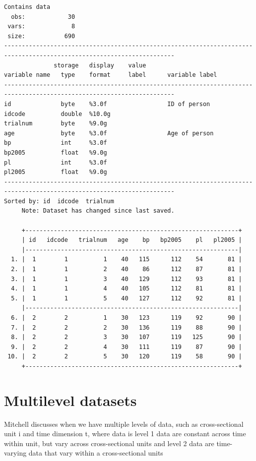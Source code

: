\documentclass[
]{book}
\begin{document}
\begin{verbatim}
Contains data
  obs:            30                          
 vars:             8                          
 size:           690                          
----------------------------------------------------------------------------------------------------------------------
              storage   display    value
variable name   type    format     label      variable label
----------------------------------------------------------------------------------------------------------------------
id              byte    %3.0f                 ID of person
idcode          double  %10.0g                
trialnum        byte    %9.0g                 
age             byte    %3.0f                 Age of person
bp              int     %3.0f                 
bp2005          float   %9.0g                 
pl              int     %3.0f                 
pl2005          float   %9.0g                 
----------------------------------------------------------------------------------------------------------------------
Sorted by: id  idcode  trialnum
     Note: Dataset has changed since last saved.

     +------------------------------------------------------------+
     | id   idcode   trialnum   age    bp   bp2005    pl   pl2005 |
     |------------------------------------------------------------|
  1. |  1        1          1    40   115      112    54       81 |
  2. |  1        1          2    40    86      112    87       81 |
  3. |  1        1          3    40   129      112    93       81 |
  4. |  1        1          4    40   105      112    81       81 |
  5. |  1        1          5    40   127      112    92       81 |
     |------------------------------------------------------------|
  6. |  2        2          1    30   123      119    92       90 |
  7. |  2        2          2    30   136      119    88       90 |
  8. |  2        2          3    30   107      119   125       90 |
  9. |  2        2          4    30   111      119    87       90 |
 10. |  2        2          5    30   120      119    58       90 |
     +------------------------------------------------------------+
\end{verbatim}

\section{Multilevel datasets}\label{multilevel-datasets}

Mitchell discusses when we have multiple levels of data, such as cross-sectional unit i and time dimension t, where data is level 1 data are constant across time within unit, but vary across cross-sectional units and level 2 data are time-varying data that vary within a cross-sectional units
\end{document}
